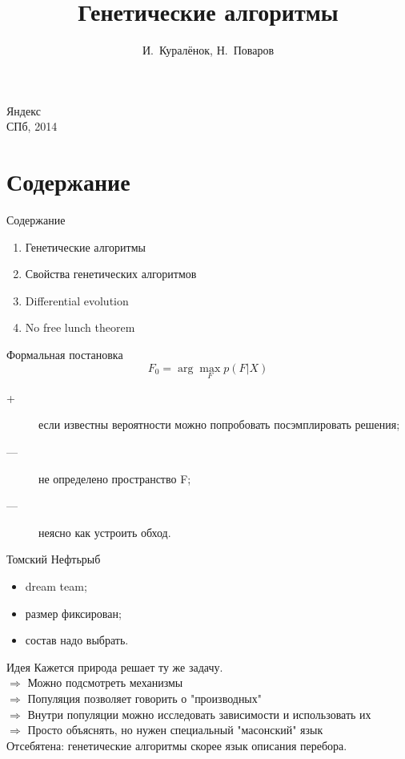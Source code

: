 \documentclass[14pt, fleqn, xcolor={dvipsnames, table}]{beamer}
\title{Генетические алгоритмы\\\small{}}
\author[]{\small{%
И.~Куралёнок,
Н.~Поваров}}
\date{}
\begin{document}
\begin{frame}
\maketitle
\small
\begin{center}
\vspace{-60pt}
\normalsize {\color{red}Я}ндекс \\
\vspace{80pt}
\footnotesize СПб, 2014
\end{center}
\end{frame}

\section{Содержание}
\begin{frame}{Содержание}
\begin{enumerate}
  \item Генетические алгоритмы
  \item Свойства генетических алгоритмов
  \item Differential evolution
  \item No free lunch theorem
\end{enumerate}
\end{frame}

\begin{frame}{Формальная постановка}
$$
F_0 = \arg\max_F p(F|X)
$$
\begin{description}
  \item[\color{green}+] если известны вероятности можно попробовать посэмплировать решения;
  \item[\color{red}---] не определено пространство F;
  \item[\color{red}---] неясно как устроить обход.
\end{description}
\end{frame}

\begin{frame}{Томский Нефтьрыб}
\begin{itemize}
  \item dream team;
  \item размер фиксирован;
  \item состав надо выбрать.
\end{itemize}
\end{frame}

\begin{frame}{Идея}
Кажется природа решает ту же задачу. \\
$\Rightarrow$ Можно подсмотреть механизмы \\
$\Rightarrow$ Популяция позволяет говорить о "производных" \\
$\Rightarrow$ Внутри популяции можно исследовать зависимости и использовать их \\
$\Rightarrow$ Просто объяснять, но нужен специальный "масонский" язык \\
Отсебятена: генетические алгоритмы скорее язык описания перебора.
\end{frame}
\end{document}

